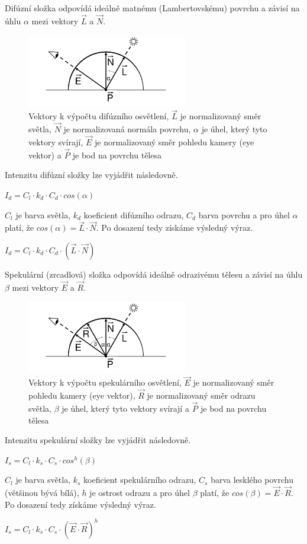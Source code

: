 \documentclass[11pt,twoside,a4paper]{book}
\begin{document}
Difúzní složka odpovídá ideálně matnému (Lambertovskému) povrchu a závisí na úhlu $\alpha$ mezi vektory $\vec{L}$ a $\vec{N}$.
\begin{center}
\begin{figure}[h!]
\includegraphics[width=70mm]{figures/phongD.png}
\caption{Vektory k výpočtu difúzního osvětlení, $\vec{L}$ je normalizovaný směr světla, $\vec{N}$ je normalizovaná normála povrchu, $\alpha$ je úhel, který tyto vektory svírají, $\vec{E}$ je normalizovaný směr pohledu kamery (eye vektor) a $\vec{P}$ je bod na povrchu tělesa}
\end{figure}
\end{center}
Intenzitu difúzní složky lze vyjádřit následovně.
\begin{center}
$I_d = C_l \cdot k_d \cdot C_d \cdot cos(\alpha)$
\end{center}
$C_l$ je barva světla, $k_d$ koeficient difúzního odrazu, $C_d$ barva povrchu a pro úhel $\alpha$ platí, že $cos(\alpha) = \vec{L} \cdot \vec{N}$. Po dosazení tedy získáme výsledný výraz.
\begin{center}
$I_d = C_l \cdot k_d \cdot C_d \cdot (\vec{L} \cdot \vec{N})$
\end{center}
\bigskip

Spekulární (zrcadlová) složka odpovídá ideálně odrazivému tělesu a závisí na úhlu $\beta$ mezi vektory $\vec{E}$ a $\vec{R}$. 
\begin{center}
\begin{figure}[h!]
\includegraphics[width=70mm]{figures/phongS.png}
\caption{Vektory k výpočtu spekulárního osvětlení, $\vec{E}$ je normalizovaný směr pohledu kamery (eye vektor), $\vec{R}$ je normalizovaný směr odrazu světla, $\beta$ je ůhel, který tyto vektory svírají a $\vec{P}$ je bod na povrchu tělesa}
\end{figure}
\end{center}
Intenzitu spekulární složky lze vyjádřit následovně.
\begin{center}
$I_s = C_l \cdot k_s \cdot C_s \cdot cos^h(\beta)$
\end{center}
$C_l$ je barva světla, $k_s$ koeficient spekulárního odrazu, $C_s$ barva lesklého povrchu (většinou bývá bílá), $h$ je ostrost odrazu a pro úhel $\beta$ platí, že $cos(\beta) = \vec{E} \cdot \vec{R}$. Po dosazení tedy získáme výsledný výraz.
\begin{center}
$I_s = C_l \cdot k_s \cdot C_s \cdot (\vec{E} \cdot \vec{R})^h$
\end{center}
\end{document}
